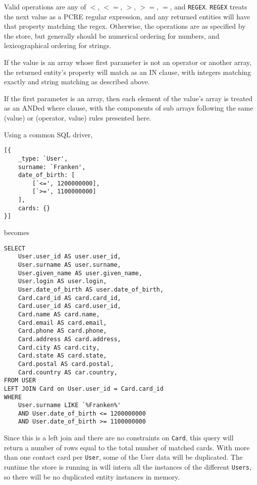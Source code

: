\documentclass{article}
\newcommand{\ilcode}{\tt}
\begin{document}
Valid operations are any of {\ilcode $<$}, {\ilcode $<=$}, {\ilcode $>$},
{\ilcode $>=$}, {\ilcode $=$}, and {\ilcode REGEX}. {\ilcode REGEX} treats the
next value as a PCRE regular expression, and any returned entities will have
that property matching the regex. Otherwise, the operations are as specified by
the store, but generally should be numerical ordering for numbers, and
lexicographical ordering for strings.



If the value is an array whose first parameter is not an operator or another
array, the returned entity's property will match as an IN clause, with integers
matching exactly and string matching as described above.

If the first parameter is an array, then each element of the value's array is
treated as an ANDed where clause, with the components of sub arrays following
the same (value) or (operator, value) rules presented here.

Using a common SQL driver,
\linespread{1}
\begin{lstlisting}
[{
	_type: `User',
	surname: `Franken',
	date_of_birth: [
		[`<=', 1200000000],
		[`>=', 1100000000]
	],
	cards: {}
}]
\end{lstlisting}
\linespread{1.6}

becomes

\linespread{1}
\begin{lstlisting}
SELECT
	User.user_id AS user.user_id,
	User.surname AS user.surname,
	User.given_name AS user.given_name,
	User.login AS user.login,
	User.date_of_birth AS user.date_of_birth,
	Card.card_id AS card.card_id,
	Card.user_id AS card.user_id,
	Card.name AS card.name,
	Card.email AS card.email,
	Card.phone AS card.phone,
	Card.address AS card.address,
	Card.city AS card.city,
	Card.state AS card.state,
	Card.postal AS card.postal,
	Card.country AS car.country,
FROM USER
LEFT JOIN Card on User.user_id = Card.card_id
WHERE
	User.surname LIKE `%Franken%'
	AND User.date_of_birth <= 1200000000
	AND User.date_of_birth >= 1100000000
\end{lstlisting}
\linespread{1.6}

Since this is a left join and there are no constraints on {\ilcode Card}, this
query will return a number of rows equal to the total number of matched cards.
With more than one contact card per {\ilcode User}, some of the User data will
be duplicated. The runtime the store is running in will intern all the instances
of the different {\ilcode Users}, so there will be no duplicated entity
instances in memory.
\end{document}
